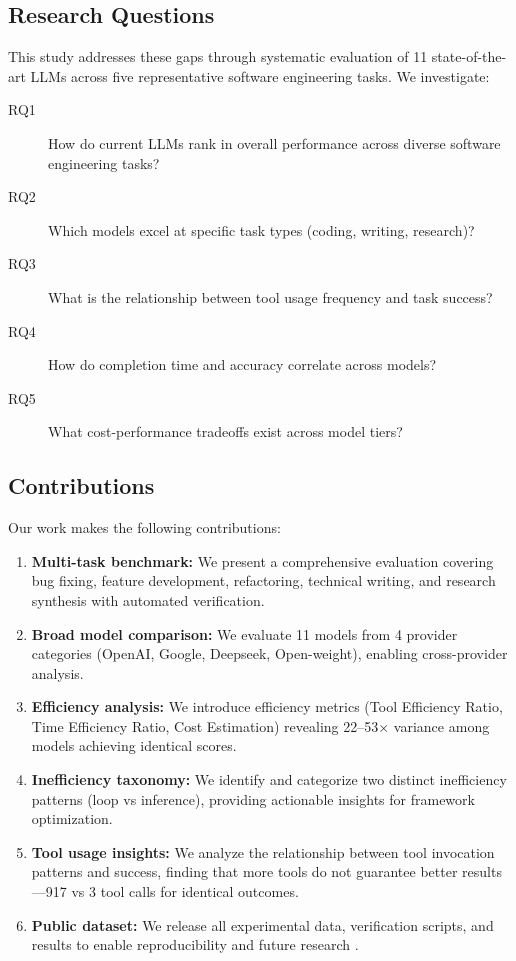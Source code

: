 \subsection{Research Questions}

This study addresses these gaps through systematic evaluation of 11 state-of-the-art LLMs across five representative software engineering tasks. We investigate:

\begin{description}
    \item[RQ1] How do current LLMs rank in overall performance across diverse software engineering tasks?
    \item[RQ2] Which models excel at specific task types (coding, writing, research)?
    \item[RQ3] What is the relationship between tool usage frequency and task success?
    \item[RQ4] How do completion time and accuracy correlate across models?
    \item[RQ5] What cost-performance tradeoffs exist across model tiers?
\end{description}

\subsection{Contributions}

Our work makes the following contributions:

\begin{enumerate}
    \item \textbf{Multi-task benchmark:} We present a comprehensive evaluation covering bug fixing, feature development, refactoring, technical writing, and research synthesis with automated verification.

    \item \textbf{Broad model comparison:} We evaluate 11 models from 4 provider categories (OpenAI, Google, Deepseek, Open-weight), enabling cross-provider analysis.

    \item \textbf{Efficiency analysis:} We introduce efficiency metrics (Tool Efficiency Ratio, Time Efficiency Ratio, Cost Estimation) revealing 22--53$\times$ variance among models achieving identical scores.

    \item \textbf{Inefficiency taxonomy:} We identify and categorize two distinct inefficiency patterns (loop vs inference), providing actionable insights for framework optimization.

    \item \textbf{Tool usage insights:} We analyze the relationship between tool invocation patterns and success, finding that more tools do not guarantee better results---917 vs 3 tool calls for identical outcomes.

    \item \textbf{Public dataset:} We release all experimental data, verification scripts, and results to enable reproducibility and future research \cite{our_dataset}.
\end{enumerate}

